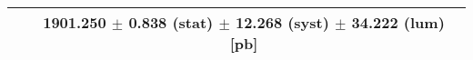 \begin{tabular}{lc}
\hline
                               & 1901.250 $\pm$ 0.838 (stat) $\pm$ 12.268 (syst) $\pm$ 34.222 (lum) [pb]  \\
\hline
\end{tabular}
